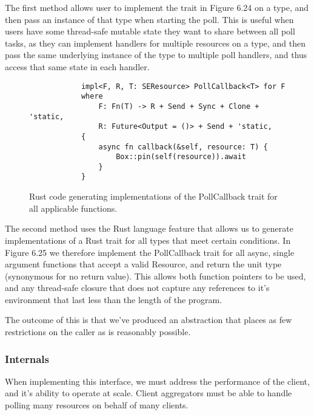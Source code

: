 The first method allows user to implement the trait in Figure 6.24 on a type, and then pass an instance of that type when starting the poll.
This is useful when users have some thread-safe mutable state they want to share between all poll tasks, as they can implement handlers for multiple resources on a type, and then pass the same underlying instance of the type to multiple poll handlers, and thus access that same state in each handler.


\begin{figure}[h]
    \begin{center}
        \begin{lstlisting}
            impl<F, R, T: SEResource> PollCallback<T> for F
            where
                F: Fn(T) -> R + Send + Sync + Clone + 'static,
                R: Future<Output = ()> + Send + 'static,
            {
                async fn callback(&self, resource: T) {
                    Box::pin(self(resource)).await
                }
            }            
        \end{lstlisting}
        \label{fig:pollimplgen}
        \vspace{-10pt}
        \caption{Rust code generating implementations of the PollCallback trait for all applicable functions.}
    \end{center}
\end{figure}

The second method uses the Rust language feature that allows us to generate implementations of a Rust trait for all types that meet certain conditions. In Figure 6.25 we therefore implement the PollCallback trait for all async, single argument functions that accept a valid Resource, and return the unit type (synonymous for no return value).
This allows both function pointers to be used, and any thread-safe closure that does not capture any references to it's environment that last less than the length of the program.

The outcome of this is that we've produced an abstraction that places as few restrictions on the caller as is reasonably possible.

\subsubsection{Internals}
When implementing this interface, we must address the performance of the client, and it's ability to operate at scale. Client aggregators must be able to handle polling many resources on behalf of many clients.

